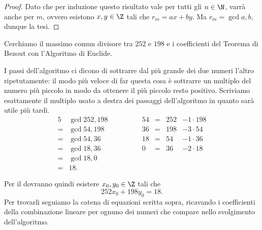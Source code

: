 \begin{proof}
    Dato che per induzione questo risultato vale per tutti gli $n \in \N$, varrà anche per $m$, ovvero esistono $x, y \in \Z$ tali che $r_m = ax + by$. Ma $r_m = \gcd{a, b}$, dunque la tesi.
\end{proof}

\begin{example}
    Cerchiamo il massimo comun divisore tra $252$ e $198$ e i coefficienti del Teorema di Bezout con l'Algoritmo di Euclide.

    I passi dell'algoritmo ci dicono di sottrarre dal più grande dei due numeri l'altro ripetutamente: il modo più veloce di far questa cosa è sottrarre un multiplo del numero più piccolo in modo da ottenere il più piccolo resto positivo. Scriviamo esattamente il multiplo usato a destra dei passaggi dell'algoritmo in quanto sarà utile più tardi.
    \begin{alignat*}{5}
            &\gcd{252, 198}   \qquad\qquad &54  &= {}&252  {}&- \boxed{1} \cdot 198\\
        = {}&\gcd{54, 198}    \qquad\qquad &36  &= {}&198  {}&- \boxed{3} \cdot 54\\
        = {}&\gcd{54, 36}     \qquad\qquad &18  &= {}&54   {}&- \boxed{1} \cdot 36\\
        = {}&\gcd{18, 36}     \qquad\qquad &0   &= {}&36   {}&- \boxed{2} \cdot 18\\
        = {}&\gcd{18, 0}      \\
        = {}&18.
    \end{alignat*}

    Per il  dovranno quindi esistere $x_0, y_0 \in \Z$ tali che \[
        252x_0 + 198y_0 = 18.    
    \] Per trovarli seguiamo la catena di equazioni scritta sopra, ricavando i coefficienti della combinazione lineare per ognuno dei numeri che compare nello svolgimento dell'algoritmo.
    

\end{example}
